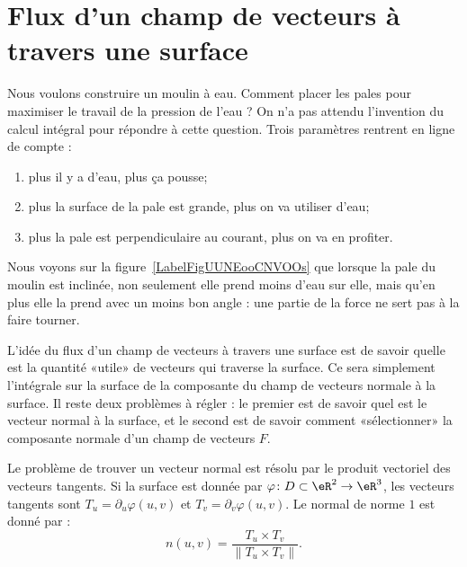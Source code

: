 \section{Flux d'un champ de vecteurs à travers une surface}

Nous voulons construire un moulin à eau. Comment placer les pales pour maximiser le travail de la pression de l'eau ? On n'a pas attendu l'invention du calcul intégral pour répondre à cette question. Trois paramètres rentrent en ligne de compte :
\begin{enumerate}
	\item
	      plus il y a d'eau, plus ça pousse;
	\item
	      plus la surface de la pale est grande, plus on va utiliser d'eau;
	\item
	      plus la pale est perpendiculaire au courant, plus on va en profiter.
\end{enumerate}
Nous voyons sur la figure~\ref{LabelFigUUNEooCNVOOs} que lorsque la pale du moulin est inclinée, non seulement elle prend moins d'eau sur elle, mais qu'en plus elle la prend avec un moins bon angle : une partie de la force ne sert pas à la faire tourner.

\newcommand{\CaptionFigUUNEooCNVOOs}{La partie rouge de la force est perdue si l'eau ne pousse pas perpendiculairement. De plus lorsque la pale est inclinée, elle prend moins d'eau sur elle.}


L'idée du flux d'un champ de vecteurs à travers une surface est de savoir quelle est la quantité «utile» de vecteurs qui traverse la surface. Ce sera simplement l'intégrale sur la surface de la composante du champ de vecteurs normale à la surface. Il reste deux problèmes à régler : le premier est de savoir quel est le vecteur normal à la surface, et le second est de savoir comment «sélectionner» la composante normale d'un champ de vecteurs \( F\).

Le problème de trouver un vecteur normal est résolu par le produit vectoriel des vecteurs tangents. Si la surface est donnée par \( \varphi\colon D\subset\eR^2\to \eR^3\), les vecteurs tangents sont \( T_u=\partial_u\varphi(u,v)\) et  \( T_v=\partial_v\varphi(u,v)\). Le normal de norme \( 1\) est donné par :
\begin{equation}
	n(u,v)=\frac{ T_u\times T_v }{ \| T_u\times T_v \| }.
\end{equation}

